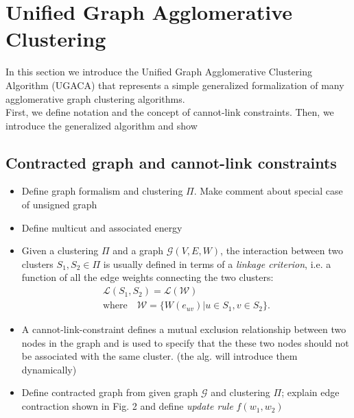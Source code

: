 \section{Unified Graph Agglomerative Clustering}
In this section we introduce the Unified Graph Agglomerative Clustering Algorithm (UGACA) that represents a simple generalized formalization of many agglomerative graph clustering algorithms. \\
First, we define notation and the concept of cannot-link constraints. Then, we introduce the generalized algorithm and show 

\subsection{Contracted graph and cannot-link constraints} \label{sec:contr_graph_and_CLC}

\begin{itemize}
\item Define graph formalism and clustering $\Pi$. Make comment about special case of unsigned graph
\item Define multicut and associated energy

\item Given a clustering $\Pi$ and a graph $\mathcal{G}(V,E,W)$, the interaction between two clusters $S_1, S_2 \in \Pi$ is usually defined in terms of a \emph{linkage criterion}, i.e. a function of all the edge weights connecting the two clusters:
\begin{equation} \label{eq:linkage_criterion_def}
\begin{gathered}
\mathcal{L}(S_1,S_2) = \mathcal{L}(\mathcal{W})\quad \\
   \text{where} \quad \mathcal{W} = \{ W(e_{uv})| u\in S_1, v\in S_2 \}.
\end{gathered}
\end{equation}

\item A cannot-link-constraint defines a mutual exclusion relationship between two nodes in the graph and is used to specify that the these two nodes should not be associated with the same cluster. (the alg. will introduce them dynamically)
\item Define contracted graph from given graph  $\mathcal{G}$ and clustering $\Pi$; explain edge contraction shown in Fig. 2 and define \emph{update rule} $f(w_1, w_2)$

\end{itemize}


